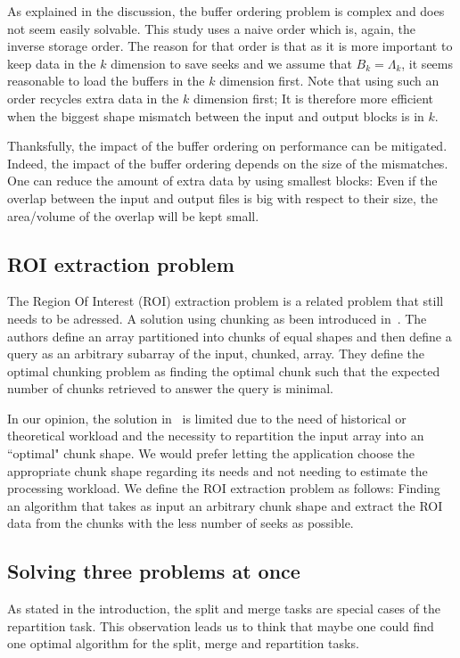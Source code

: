 \documentclass[sigconf, nonacm]{acmart}
\begin{document}
As explained in the discussion, the buffer ordering problem is complex and does
not seem easily solvable.
This study uses a naive order which is, again, the inverse storage order.
The reason for that order is that as it is more important to keep data in the
$k$ dimension to save seeks and we assume that $B_k=\Lambda_k$, it seems
reasonable to load the buffers in the $k$ dimension first.
Note that using such
an order recycles extra data in the $k$ dimension first; It is therefore
more efficient when the biggest shape mismatch between the input and output
blocks is in $k$.

Thanksfully, the impact of the buffer ordering on performance can be
mitigated. Indeed, the impact of the buffer ordering depends on the size of the
mismatches. One can reduce the amount of extra data by using smallest blocks: Even
if the overlap between the input and output files is big with respect to their
size, the area/volume of the overlap will be kept small.

\subsection{ROI extraction problem}
The Region Of Interest (ROI) extraction problem is a related problem that still
needs to be adressed.
A solution using chunking as been introduced in~\cite{optimal_chuking}.
The authors define an array partitioned into chunks of equal shapes and then
define a query as an arbitrary subarray of the input, chunked, array.
They define the optimal chunking problem as finding the optimal chunk such
that the expected number of chunks retrieved to answer the query is minimal.

In our opinion, the solution in~\cite{optimal_chuking} is limited due to the
need of historical or theoretical workload and the necessity to repartition the
input array into an ``optimal" chunk shape.
We would prefer letting the application choose the appropriate chunk shape
regarding its needs and not needing to estimate the processing workload.
We define the ROI extraction problem as follows: Finding an algorithm that takes
as input an arbitrary chunk shape and extract the ROI data from the chunks with
the less number of seeks as possible.

\subsection{Solving three problems at once}
As stated in the introduction, the split and merge tasks are special cases of
the repartition task. This observation leads us to think that maybe one could find
one optimal algorithm for the split, merge and repartition tasks.
\end{document}
